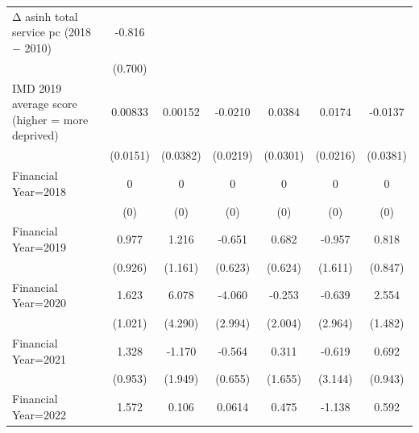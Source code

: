 \begin{table}[htbp]
\begin{tabular}{l*{6}{c}}
\addlinespace
Δ asinh total service pc (2018 − 2010)&      -0.816         &                     &                     &                     &                     &                     \\
                    &     (0.700)         &                     &                     &                     &                     &                     \\
\addlinespace
IMD 2019 average score (higher = more deprived)&     0.00833         &     0.00152         &     -0.0210         &      0.0384         &      0.0174         &     -0.0137         \\
                    &    (0.0151)         &    (0.0382)         &    (0.0219)         &    (0.0301)         &    (0.0216)         &    (0.0381)         \\
\addlinespace
Financial Year=2018 &           0         &           0         &           0         &           0         &           0         &           0         \\
                    &         (0)         &         (0)         &         (0)         &         (0)         &         (0)         &         (0)         \\
\addlinespace
Financial Year=2019 &       0.977         &       1.216         &      -0.651         &       0.682         &      -0.957         &       0.818         \\
                    &     (0.926)         &     (1.161)         &     (0.623)         &     (0.624)         &     (1.611)         &     (0.847)         \\
\addlinespace
Financial Year=2020 &       1.623         &       6.078         &      -4.060         &      -0.253         &      -0.639         &       2.554\sym{*}  \\
                    &     (1.021)         &     (4.290)         &     (2.994)         &     (2.004)         &     (2.964)         &     (1.482)         \\
\addlinespace
Financial Year=2021 &       1.328         &      -1.170         &      -0.564         &       0.311         &      -0.619         &       0.692         \\
                    &     (0.953)         &     (1.949)         &     (0.655)         &     (1.655)         &     (3.144)         &     (0.943)         \\
\addlinespace
Financial Year=2022 &       1.572         &       0.106         &      0.0614         &       0.475         &      -1.138         &       0.592         \\

\end{tabular}
\end{table}
